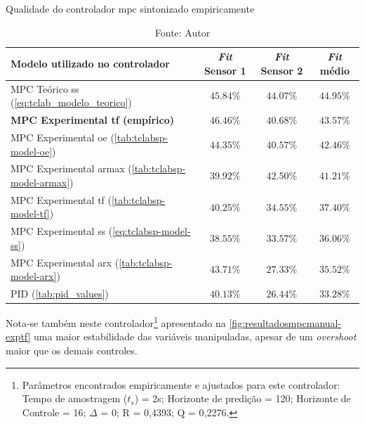 \begin{table}[!h]
	\centering
	\caption{Qualidade do controlador \acrshort{mpc} sintonizado empiricamente}
	\label{tab:resultados_mpc_e_pid_e_manual}
	\begin{tabular}{l|cc|c} \toprule
		{Modelo utilizado no controlador}              			            &	{\textit{Fit} Sensor 1}	    &	{\textit{Fit} Sensor 2}     & {\textit{Fit} médio}			    \\ \midrule
		MPC Teórico \acrshort{ss} (\cref{eq:tclab_modelo_teorico})	        &   $45.84\%$                   &   $44.07\%$                   &   $44.95\%$                       \\ 
		\textbf{MPC Experimental \acrshort{tf} (empírico)}                  &   $\mathbf{46.46\%}$          &   $\mathbf{40.68\%}$          &   $\mathbf{43.57\%}$              \\ 
		MPC Experimental \acrshort{oe} (\cref{tab:tclabsp-model-oe})	    &   $44.35\%$                   &   $40.57\%$                   &   $42.46\%$                       \\ 
		MPC Experimental \acrshort{armax} (\cref{tab:tclabsp-model-armax})	&   $39.92\%$                   &   $42.50\%$                   &   $41.21\%$                       \\ 
		MPC Experimental \acrshort{tf} (\cref{tab:tclabsp-model-tf})		&   $40.25\%$                   &   $34.55\%$                   &   $37.40\%$                       \\ 
		MPC Experimental \acrshort{ss} (\cref{eq:tclabsp-model-ss})			&   $38.55\%$                   &   $33.57\%$                   &   $36.06\%$                       \\ 
		MPC Experimental \acrshort{arx}	(\cref{tab:tclabsp-model-arx})		&   $43.71\%$                   &   $27.33\%$                   &   $35.52\%$                       \\ 
		PID (\cref{tab:pid_values})	                                        &   $40.13\%$                   &   $26.44\%$                   &   $33.28\%$                       \\ \bottomrule 
	\end{tabular}
	\caption*{Fonte: Autor}
\end{table}

Nota-se também neste controlador\footnote{
    Parâmetros encontrados empiricamente e ajustados para este controlador: Tempo de amostragem ($t_s$) = 2s; Horizonte de predição = 120;
    Horizonte de Controle = 16; $\Delta$ = 0; R = 0,4393; Q = 0,2276.
} apresentado na \cref{fig:resultadosmpcmanual-exptf} uma maior estabilidade
das variáveis manipuladas, apesar de um \textit{overshoot} maior que os demais controles.

